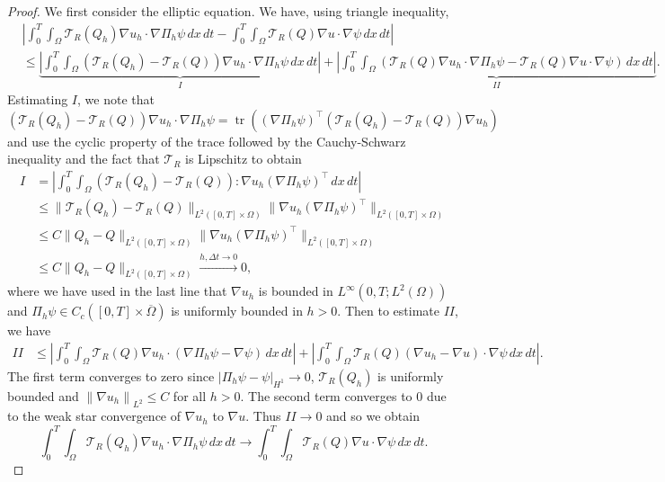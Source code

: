 \documentclass[10pt,letterpaper]{amsart}
\DeclareMathOperator{\tr}{\text{tr}}
\newcommand\norm[1]{\left\lVert#1\right\rVert}
\newcommand{\Grad}{\nabla}
\newcommand{\T}{\mathcal T}
\theoremstyle{definition}{\newtheorem{definition}[lemma]{Definition}}
\theoremstyle{note}{\newtheorem{claim}{Claim}[section]
\newtheorem*{claim*}{Claim}}
\numberwithin{equation}{section}
\begin{document}
\begin{proof}
We first consider the elliptic equation.  We have, using triangle inequality,
\begin{align*}
	&\left\lvert \int_0^T \int_\Omega\T_R(Q_h)\nabla u_h\cdot\nabla\Pi_h\psi\, dx\, dt - \int_0^T\int_\Omega \T_R(Q)\nabla u\cdot\nabla\psi\, dx\, dt\right\rvert\\
	&\le \underbrace{\left\lvert \int_0^T\int_\Omega (\T_R(Q_h)-\T_R(Q))\nabla u_h\cdot\nabla\Pi_h\psi\, dx\, dt\right\rvert}_{I} + \underbrace{\left\lvert\int_0^T\int_\Omega \left(\T_R(Q)\nabla u_h\cdot\nabla\Pi_h\psi - \T_R(Q)\nabla u\cdot\nabla\psi\right)\, dx\, dt\right\rvert}_{II}.
\end{align*}
Estimating $I$, we note that $(\T_R(Q_h)-\T_R(Q))\nabla u_h\cdot\nabla\Pi_h\psi = \tr((\nabla\Pi_h\psi)^\top(\T_R(Q_h)-\T_R(Q))\nabla u_h)$ and use the cyclic property of the trace followed by the Cauchy-Schwarz inequality and the fact that $\T_R$ is Lipschitz to obtain
\begin{align*}
	I
	&= \left\lvert \int_0^T\int_\Omega (\T_R(Q_h) - \T_R(Q)):\nabla u_h(\nabla\Pi_h\psi)^\top\, dx\, dt\right\rvert\\
	&\le \|\T_R(Q_h) - \T_R(Q)\|_{L^2([0,T]\times\Omega)}\|\nabla u_h(\nabla\Pi_h\psi)^\top\|_{L^2([0,T]\times\Omega)}\\
	&\le C\|Q_h - Q\|_{L^2([0,T]\times\Omega)}\|\nabla u_h(\nabla\Pi_h\psi)^\top\|_{L^2([0,T]\times\Omega)}\\
	&\le C\|Q_h - Q\|_{L^2([0,T]\times\Omega)} \stackrel{h,\Delta t\to 0}{\longrightarrow} 0,
\end{align*}
where we have used in the last line that $\nabla u_h$ is bounded in $L^\infty(0,T;L^2(\Omega))$ and $\Pi_h\psi \in C_c([0,T]\times\overline{\Omega})$ is uniformly bounded in $h>0$.
Then to estimate $II$, we have
\begin{align*}
	II 
	&\le \left\lvert \int_0^T\int_\Omega\T_R(Q)\nabla u_h\cdot(\nabla\Pi_h\psi - \nabla \psi)\, dx\, dt\right\rvert + \left\lvert \int_0^T\int_\Omega \T_R(Q)(\nabla u_h - \nabla u)\cdot\nabla \psi\, dx\, dt\right\rvert.
\end{align*}
The first term converges to zero since $|\Pi_h \psi - \psi|_{H^1}\to 0$, $\mathcal{T}_R(Q_h)$ is uniformly bounded and $\norm{\Grad u_h}_{L^2}\leq C$ for all $h>0$.
The second term converges to $0$ due to the weak star convergence of $\nabla u_h$ to $\nabla u$. Thus $II \to 0$ and so we obtain
\begin{equation}
	\label{eq:elliptic2_convergence}
	\int_0^T \int_\Omega \T_R(Q_h)\nabla u_h\cdot\nabla\Pi_h\psi\, dx\, dt \to \int_0^T\int_\Omega \T_R(Q)\nabla u\cdot\nabla\psi\, dx\, dt.

\end{equation}
\end{proof}
\end{document}
